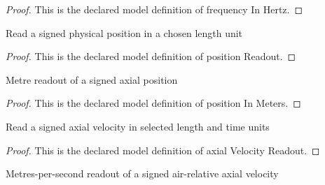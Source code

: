 \begin{proof}
  This is the declared model definition of frequency In Hertz.
\end{proof}
\begin{definition}
  \label{def:physics:phyx-mini-0196:phyxminiproblems-problemphyxmini0196-positionreadout}
  Read a signed physical position in a chosen length unit
\end{definition}
\begin{proof}
  This is the declared model definition of position Readout.
\end{proof}
\begin{definition}
  \label{def:physics:phyx-mini-0196:phyxminiproblems-problemphyxmini0196-positioninmeters}
  Metre readout of a signed axial position
\end{definition}
\begin{proof}
  This is the declared model definition of position In Meters.
\end{proof}
\begin{definition}
  \label{def:physics:phyx-mini-0196:phyxminiproblems-problemphyxmini0196-axialvelocityreadout}
  Read a signed axial velocity in selected length and time units
\end{definition}
\begin{proof}
  This is the declared model definition of axial Velocity Readout.
\end{proof}
\begin{definition}
  \label{def:physics:phyx-mini-0196:phyxminiproblems-problemphyxmini0196-axialvelocityinmeterspersecond}
  Metres-per-second readout of a signed air-relative axial velocity
\end{definition}
